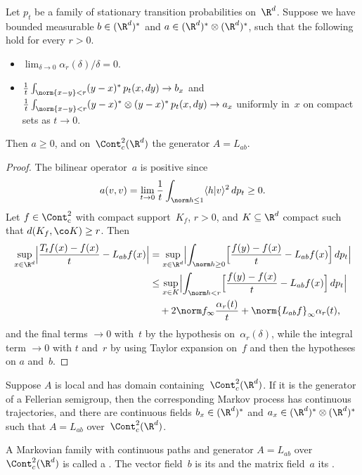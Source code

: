 \begin	{theorem}
Let $p_t$ be a family of stationary transition probabilities on~$\R^d$.
Suppose we have bounded measurable \( b \in (\R^d)^* \)
and \( a \in (\R^d)^*\otimes(\R^d)^* \),
such that the following hold for every \( r > 0 \).
\begin	{itemize}
\item	\( \lim_{\delta\to0} \alpha_r(\delta)/\delta = 0 \).
\item	\( \tfrac1t\int_{\norm{x-y}<r} (y-x)^* \,p_t(x,dy) \to b_x \)
	and \( \tfrac1t\int_{\norm{x-y}<r} (y-x)^* \otimes (y-x)^*
		\,p_t(x,dy) \to a_x \)
	uniformly in~$x$ on compact sets as \( t \to 0 \).
\end	{itemize}
Then \( a \ge 0 \),
and on~$\Cont^2_c(\R^d)$ the generator \( A = L_{ab} \).
\end	{theorem}
\begin	{proof}
The bilinear operator~$a$ is positive since
\[ a(v,v) = \lim_{t\to0} \frac1t \int_{\norm h\le1} \langle h\vert v\rangle^2
	\,dp_t \ge 0 \text. \]
Let \( f \in \Cont^2_\mathrm c \) with compact support~$K_f$, \( r > 0 \),
and \( K \subseteq \R^d \) compact such that \( d(K_f,\co K) \ge r \).
Then
\begin	{align*}
	\sup_{x\in\R^d} \Bigl\lvert
		\frac{T_t f(x) - f(x)}{t} - L_{ab}f(x)
	\Bigr\rvert
	&= \sup_{x\in\R^d} \Bigl\lvert
		\int_{\norm h\ge0}\Bigl[
			\frac{f(y)-f(x)}{t} - L_{ab}f(x)
		\Bigr] \,dp_t
	   \Bigr\rvert \\
	&\le \sup_{x\in K} \Bigl\lvert
			\int_{\norm h<r}\Bigl[
				\frac{f(y)-f(x)}{t} - L_{ab}f(x)
			\Bigr] \,dp_t
		\Bigr\rvert \\
	&\quad	+ 2\norm f_\infty \frac{\alpha_r(t)}{t}
		+ \norm{L_{ab}f}_\infty \alpha_r(t)
	\text,
\end	{align*}
and the final terms \( \to 0 \) with~$t$
by the hypothesis on~$\alpha_r(\delta)$,
while the integral term \( \to 0 \) with $t$ and~$r$
by using Taylor expansion on~$f$
and then the hypotheses on $a$ and~$b$.
\end	{proof}

\begin	{theorem}
Suppose $A$ is local and has domain containing~$\Cont^2_c(\R^d)$.
If it is the generator of a Fellerian semigroup,
then the corresponding Markov process has continuous trajectories,
and there are continuous fields \( b_x \in (\R^d)^* \)
and \( a_x \in (\R^d)^* \otimes (\R^d)^* \)
such that \( A = L_{ab} \) over~$\Cont^2_c(\R^d)$.
\end	{theorem}

\begin	{definition}
A Markovian family with continuous paths
and generator \( A = L_{ab} \) over~$\Cont^2_c(\R^d)$
is called a .
The vector field~$b$ is its 
and the matrix field~$a$ its .
\end	{definition}
